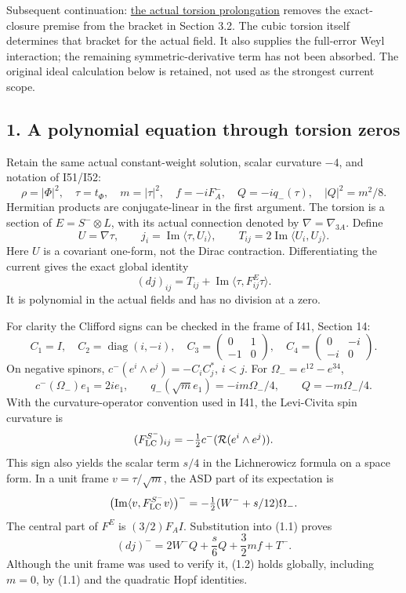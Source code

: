 \documentclass[
  10pt,
]{article}
\begin{document}
Subsequent continuation:
\href{20260928_actual_torsion_prolongation.md}{the actual torsion
prolongation} removes the exact-closure premise from the bracket in
Section 3.2. The cubic torsion itself determines that bracket for the
actual field. It also supplies the full-error Weyl interaction; the
remaining symmetric-derivative term has not been absorbed. The original
ideal calculation below is retained, not used as the strongest current
scope.

\hypertarget{a-polynomial-equation-through-torsion-zeros}{%
\subsection{1. A polynomial equation through torsion
zeros}\label{a-polynomial-equation-through-torsion-zeros}}

Retain the same actual constant-weight solution, scalar curvature
\(-4\), and notation of I51/I52: \[
 \rho=|\Phi|^2,\quad \tau=t_\Phi,\quad m=|\tau|^2,\quad
 f=-iF_A^-,\quad Q=-iq_-(\tau),\quad |Q|^2=m^2/8.
\] Hermitian products are conjugate-linear in the first argument. The
torsion is a section of \(E=S^-\otimes L\), with its actual connection
denoted by \(\nabla=\nabla_{3A}\). Define \[
 U=\nabla\tau,\qquad j_i=\operatorname{Im}\langle\tau,U_i\rangle,
 \qquad T_{ij}=2\operatorname{Im}\langle U_i,U_j\rangle .
\] Here \(U\) is a covariant one-form, not the Dirac contraction.
Differentiating the current gives the exact global identity \[
 (dj)_{ij}=T_{ij}+
           \operatorname{Im}\langle\tau,F^E_{ij}\tau\rangle .
                                                               \tag{1.1}
\] It is polynomial in the actual fields and has no division at a zero.

For clarity the Clifford signs can be checked in the frame of I41,
Section 14: \[
 C_1=I,\quad C_2=\operatorname{diag}(i,-i),\quad
 C_3=\begin{pmatrix}0&1\\-1&0\end{pmatrix},\quad
 C_4=\begin{pmatrix}0&-i\\-i&0\end{pmatrix}.
\] On negative spinors, \(c^-(e^i\wedge e^j)=-C_iC_j^*\), \(i<j\). For
\(\Omega_-=e^{12}-e^{34}\), \[
 c^-(\Omega_-)e_1=2ie_1,\qquad
 q_-(\sqrt m e_1)=-im\Omega_-/4,\qquad Q=-m\Omega_-/4.
\] With the curvature-operator convention used in I41, the Levi-Civita
spin curvature is \[
 (F_{\rm LC}^{S^-})_{ij}
        =-\tfrac12c^-(\mathcal R(e^i\wedge e^j)).
\] This sign also yields the scalar term \(s/4\) in the Lichnerowicz
formula on a space form. In a unit frame \(v=\tau/\sqrt m\), the ASD
part of its expectation is \[
 \bigl(\operatorname{Im}\langle v,F_{\rm LC}^{S^-}v\rangle\bigr)^-
       =-\tfrac12(W^-+s/12)\Omega_-.
\] The central part of \(F^E\) is \((3/2)F_A I\). Substitution into
(1.1) proves \[
 \boxed{(dj)^-=2W^-Q+\frac{s}{6}Q+\frac32 m f+T^-.}    \tag{1.2}
\] Although the unit frame was used to verify it, (1.2) holds globally,
including \(m=0\), by (1.1) and the quadratic Hopf identities.
\end{document}
